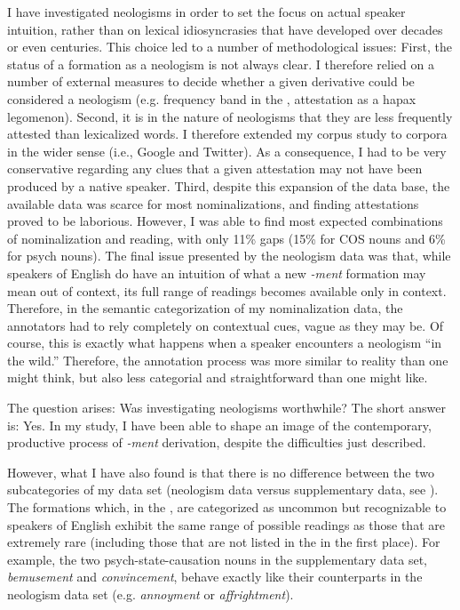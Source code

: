 I have investigated neologisms in order to set the focus on actual speaker intuition, rather than on lexical idiosyncrasies that have developed over decades or even centuries. This choice led to a number of methodological issues:
First, the status of a formation as a neologism is not always clear. I therefore relied on a number of external measures to decide whether a given derivative could be considered a neologism (e.g. frequency band in the , attestation as a hapax legomenon). 
Second, it is in the nature of neologisms that they are less frequently attested than lexicalized words. I therefore extended my corpus study to corpora in the wider sense (i.e., Google and Twitter). As a consequence, I had to be very conservative regarding any clues that a given attestation may not have been produced by a native speaker. 
Third, despite this expansion of the data base, the available data was scarce for most nominalizations, and finding attestations proved to be laborious. However, I was able to find most expected combinations of nominalization and reading, with only 11\% gaps (15\% for COS nouns and 6\% for psych nouns).
The final issue presented by the neologism data was that, while speakers of English do have an intuition of what a new \textit{-ment} formation may mean out of context, its full range of readings becomes available only in context. Therefore, in the semantic categorization of my nominalization data, the annotators had to rely completely on contextual cues, vague as they may be. 
Of course, this is exactly what happens when a speaker encounters a neologism ``in the wild.'' Therefore, the annotation process was more similar to reality than one might think, but also less categorial and straightforward than one might like.

The question arises: Was investigating neologisms worthwhile? The short answer is: Yes. In my study, I have been able to shape an image of the contemporary, productive process of \textit{-ment} derivation, despite the difficulties just described. 

However, what I have also found is that there is no difference between the two subcategories of my data set (neologism data versus supplementary data, see ). The formations which, in the , are categorized as uncommon but recognizable to speakers of English exhibit the same range of possible readings as those that are extremely rare (including those that are not listed in the  in the first place). 
For example, the two psych-state-causation nouns in the supplementary data set, \textit{bemusement} and \textit{convincement}, behave exactly like their counterparts in the neologism data set (e.g. \textit{annoyment} or \textit{affrightment}).

